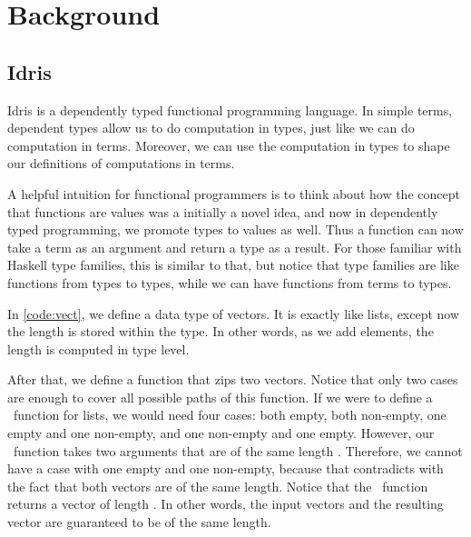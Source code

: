 \section{Background}\label{sec:background}

\newcommand{\zip}{\fn{zip}}
\subsection{Idris}

Idris is a dependently typed functional programming language. In simple terms,
dependent types allow us to do computation in types, just like we can do
computation in terms.\cite{davidphd} Moreover, we can use the computation
in types to shape our definitions of computations in terms.

A helpful intuition for functional programmers is to think about how the
concept that functions are values was a initially a novel idea, and now in
dependently typed programming, we promote types to values as well.
Thus a function can now take a term as an argument and return a type as a
result.\cite{lambdacube,henk}
For those familiar with Haskell type families\cite{typefamilies}, this is
similar to that, but notice that type families are like functions from types to types,
while we can have functions from terms to types.

In \autoref{code:vect}, we define a data type of vectors. It is exactly
like lists, except now the length is stored within the type. In other
words, as we add elements, the length is computed in type level.

After that, we define a function that zips two vectors. Notice that only two
cases are enough to cover all possible paths of this function. If we were to
define a \zip\ function for lists, we would need four cases: both empty, both
non-empty, one empty and one non-empty, and one non-empty and one empty.
However, our \zip\ function takes two arguments that are of the same length
.  Therefore, we cannot have a case with one empty and one non-empty,
because that contradicts with the fact that both vectors are of the same
length. Notice that the \zip\ function returns a vector of length .
In other words, the input vectors and the resulting vector are guaranteed to be
of the same length.

